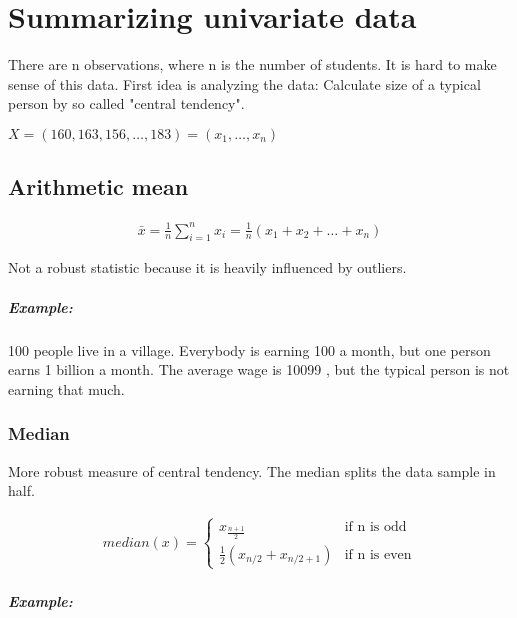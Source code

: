 \chapter{Summarizing univariate data}
There are n observations, where n is the number of students.
It is hard to make sense of this data. 
First idea is analyzing the data: 
Calculate size of a typical person by so called "central tendency".

\begin{center}
    $ X=(160, 163, 156, \ldots, 183) = (x_{1},\ldots, x_{n})$
\end{center}
    
\section {Arithmetic mean}

\begin{align}
\bar{x} = \frac{1}{n}\sum_{i=1}^{n}x_{i} = \frac{1}{n}\left(x_{1}+x_{2}+\ldots+x_{n}\right)
\end{align}

Not a robust statistic because it is heavily influenced by outliers.
\paragraph{Example:} 100 people live in a village. Everybody is earning 100 \texteuro \hspace{0.1cm} a month, but one person earns 1 billion \texteuro \hspace{0.1cm} a month. The average wage is 10099 \texteuro, but the typical person is not earning that much. 
    
    
\subsection {Median}
More robust measure of central tendency.
The median splits the data sample in half. 

\begin{align}
      median(x) = 
      \begin{cases}
          x_{\frac{n+1}{2}} & \text{if n is odd}\\
          \frac{1}{2}(x_{n/2}+x_{n/2+1}) & \text{if n is even}
      \end{cases}
\end{align}       
    
    
\paragraph{Example:}

